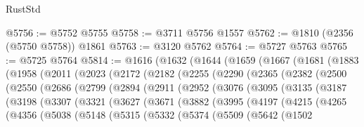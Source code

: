 \begin{lexlean}{RustStd}
\begin{coremodule}
@5756 := @5752 @5755
@5758 := @3711 @5756 @1557
@5762 := @1810 (@2356 (@5750 @5758)) @1861
@5763 := @3120 @5762
@5764 := @5727 @5763
@5765 := @5725 @5764
@5814 := @1616
    (@1632
      (@1644
        (@1659
          (@1667
            (@1681
              (@1883
                (@1958
                  (@2011
                    (@2023
                      (@2172
                        (@2182
                          (@2255
                            (@2290
                              (@2365
                                (@2382
                                  (@2500
                                    (@2550
                                      (@2686
                                        (@2799
                                          (@2894
                                            (@2911
                                              (@2952
                                                (@3076
                                                  (@3095
                                                    (@3135
                                                      (@3187
                                                        (@3198
                                                          (@3307
                                                            (@3321
                                                              (@3627
                                                                (@3671
                                                                  (@3882
                                                                    (@3995
                                                                      (@4197
                                                                        (@4215
                                                                          (@4265
                                                                            (@4356
                                                                              (@5038
                                                                                (@5148
                                                                                  (@5315
                                                                                    (@5332
                                                                                      (@5374
                                                                                        (@5509
                                                                                          (@5642
                                                                                            (@1502

\end{coremodule}
\end{lexlean}
